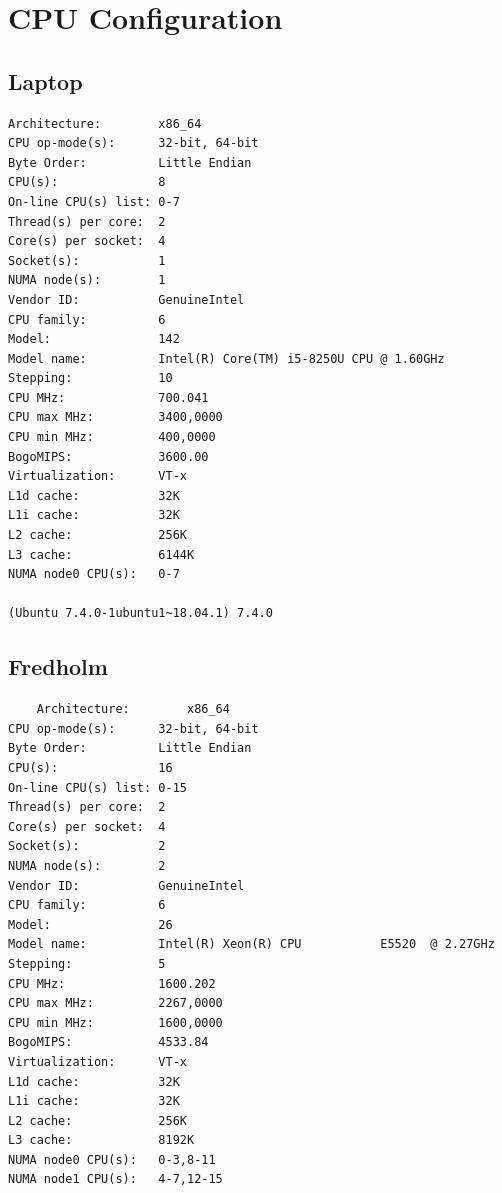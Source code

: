 \documentclass{article}
\begin{document}
\section{CPU Configuration}
\subsection{Laptop}
\begin{verbatim}
Architecture:        x86_64
CPU op-mode(s):      32-bit, 64-bit
Byte Order:          Little Endian
CPU(s):              8
On-line CPU(s) list: 0-7
Thread(s) per core:  2
Core(s) per socket:  4
Socket(s):           1
NUMA node(s):        1
Vendor ID:           GenuineIntel
CPU family:          6
Model:               142
Model name:          Intel(R) Core(TM) i5-8250U CPU @ 1.60GHz
Stepping:            10
CPU MHz:             700.041
CPU max MHz:         3400,0000
CPU min MHz:         400,0000
BogoMIPS:            3600.00
Virtualization:      VT-x
L1d cache:           32K
L1i cache:           32K
L2 cache:            256K
L3 cache:            6144K
NUMA node0 CPU(s):   0-7

(Ubuntu 7.4.0-1ubuntu1~18.04.1) 7.4.0

\end{verbatim}\textbf{}
\newpage
\subsection{Fredholm}
\begin{verbatim}
    Architecture:        x86_64
CPU op-mode(s):      32-bit, 64-bit
Byte Order:          Little Endian
CPU(s):              16
On-line CPU(s) list: 0-15
Thread(s) per core:  2
Core(s) per socket:  4
Socket(s):           2
NUMA node(s):        2
Vendor ID:           GenuineIntel
CPU family:          6
Model:               26
Model name:          Intel(R) Xeon(R) CPU           E5520  @ 2.27GHz
Stepping:            5
CPU MHz:             1600.202
CPU max MHz:         2267,0000
CPU min MHz:         1600,0000
BogoMIPS:            4533.84
Virtualization:      VT-x
L1d cache:           32K
L1i cache:           32K
L2 cache:            256K
L3 cache:            8192K
NUMA node0 CPU(s):   0-3,8-11
NUMA node1 CPU(s):   4-7,12-15

\end{verbatim}
\newpage
\end{document}
